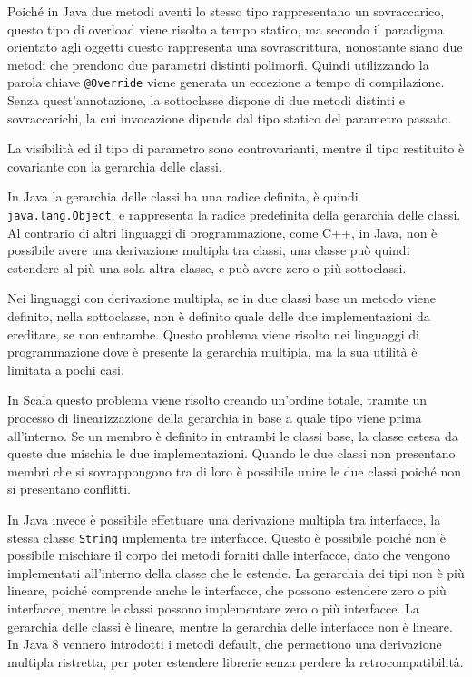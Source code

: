 \documentclass{article}
\numberwithin{equation}{subsection}
\begin{document}
Poiché in Java due metodi aventi lo stesso tipo rappresentano un sovraccarico, questo tipo di overload viene risolto a tempo statico, ma secondo il paradigma orientato 
agli oggetti questo rappresenta una sovrascrittura, nonostante siano due metodi che prendono due parametri distinti polimorfi. Quindi utilizzando la parola chiave \verb|@Override| 
viene generata un eccezione a tempo di compilazione. 
Senza quest'annotazione, la sottoclasse dispone di due metodi distinti e sovraccarichi, la cui invocazione dipende dal tipo statico del parametro passato. 

La visibilità ed il tipo di parametro sono controvarianti, mentre il tipo restituito è covariante con la gerarchia delle classi. 


In Java la gerarchia delle classi ha una radice definita, è quindi \verb|java.lang.Object|, e rappresenta la radice predefinita della gerarchia delle classi. 
Al contrario di altri linguaggi di programmazione, come C++, in Java, non è possibile avere una derivazione multipla tra classi, una classe può quindi estendere al più una 
sola altra classe, e può avere zero o più sottoclassi. 


Nei linguaggi con derivazione multipla, se in due classi base un metodo viene definito, nella sottoclasse, non è definito quale delle due implementazioni da ereditare, se non entrambe. 
Questo problema viene risolto nei linguaggi di programmazione dove è presente la gerarchia multipla, ma la sua utilità è limitata a pochi casi. 

In Scala questo problema viene risolto creando un'ordine totale, tramite un processo di linearizzazione della gerarchia in base a quale tipo viene prima all'interno. 
Se un membro è definito in entrambi le classi base, la classe estesa da queste due mischia le due implementazioni. Quando le due classi non presentano membri che 
si sovrappongono tra di loro è possibile unire le due classi poiché non si presentano conflitti. 

In Java invece è possibile effettuare una derivazione multipla tra interfacce, la stessa classe \verb|String| implementa tre interfacce. Questo è possibile poiché non è 
possibile mischiare il corpo dei metodi forniti dalle interfacce, dato che vengono implementati all'interno della classe che le estende. 
La gerarchia dei tipi non è più lineare, poiché comprende anche le interfacce, che possono estendere zero o più interfacce, mentre le classi possono implementare zero o più 
interfacce. 
La gerarchia delle classi è lineare, mentre la gerarchia delle interfacce non è lineare. In Java 8 vennero introdotti i metodi default, che permettono una derivazione multipla 
ristretta, per poter estendere librerie senza perdere la retrocompatibilità. 
\end{document}
